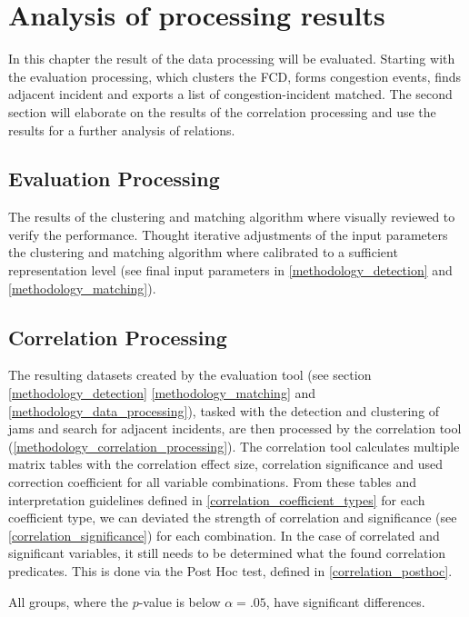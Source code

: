 \chapter{Analysis of processing results}
\label{analysis_processing}
In this chapter the result of the data processing will be evaluated. Starting with the evaluation processing, which clusters the FCD, forms congestion events, finds adjacent incident and exports a list of congestion-incident matched. The second section will elaborate on the results of the correlation processing and use the results for a further analysis of relations.

\section{Evaluation Processing}
The results of the clustering and matching algorithm where visually reviewed to verify the performance. Thought iterative adjustments of the input parameters the clustering and matching algorithm where calibrated to a sufficient representation level (see final input parameters in \autoref{methodology_detection} and \autoref{methodology_matching}).


\section{Correlation Processing}
\label{analysis_processing_evaluation}
The resulting datasets created by the evaluation tool (see section \autoref{methodology_detection} \autoref{methodology_matching} and \autoref{methodology_data_processing}), tasked with the detection and clustering of jams and search for adjacent incidents, are then processed by the correlation tool (\autoref{methodology_correlation_processing}). The correlation tool calculates multiple matrix tables with the correlation effect size, correlation significance and used correction coefficient for all variable combinations. From these tables and interpretation guidelines defined in \autoref{correlation_coefficient_types} for each coefficient type, we can deviated the strength of correlation and significance (see \autoref{correlation_significance}) for each combination. In the case of correlated and significant variables, it still needs to be determined what the found correlation predicates. This is done via the Post Hoc test, defined in \autoref{correlation_posthoc}.

All groups, where the $p$-value is below $\alpha=.05$, have significant differences.

